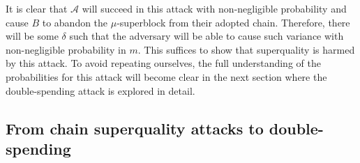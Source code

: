 It is clear
that $\mathcal{A}$ will succeed in this attack with non-negligible probability
and cause $B$ to abandon the $\mu$-superblock from their adopted chain.
Therefore, there will be some $\delta$ such that the adversary will be able to
cause such variance with non-negligible probability in $m$. This suffices to
show that superquality is harmed by this attack.
To avoid repeating ourselves, the full understanding of the probabilities for
this attack will become clear in the next section where the double-spending
attack is explored in detail.

\subsection{From chain superquality attacks to double-spending}

%
%


